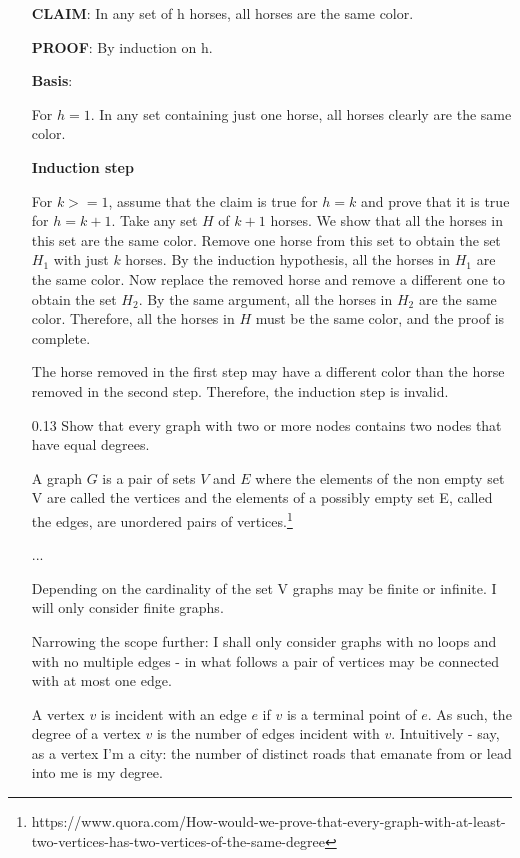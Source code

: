 \begin{enumerate}
          \textbf{CLAIM}: In any set of h horses, all horses are the same color.

          \textbf{PROOF}: By induction on h.

          \textbf{Basis}:

          For $h = 1$. In any set containing just one horse, all horses clearly are the same color.

          \textbf{Induction step}

          For $k >= 1$, assume that the claim is true for $h = k$ and prove that it is true for $h = k+1$. Take any set $H$ of $k+1$ horses. We show that all the horses in this set are the same color. Remove one horse from this set to obtain the set $H_1$ with just $k$ horses. By the induction hypothesis, all the horses in $H_1$ are the same color. Now replace the removed horse and remove a different one to obtain the set $H_2$. By the same argument, all the horses in $H_2$ are the same color. Therefore, all the horses in $H$ must be the same color, and the proof is complete.

          The horse removed in the first step may have a different color than the horse removed in the second step. Therefore, the induction step is invalid.

    \item[0.13]
          Show that every graph with two or more nodes contains two nodes that have equal degrees.

          A graph $G$ is a pair of sets $V$ and $E$ where the elements of the non empty set V are called the vertices and the elements of a possibly empty set E, called the edges, are unordered pairs of vertices.\footnote{https://www.quora.com/How-would-we-prove-that-every-graph-with-at-least-two-vertices-has-two-vertices-of-the-same-degree}

          ...

          Depending on the cardinality of the set V graphs may be finite or infinite. I will only consider finite graphs.

          Narrowing the scope further: I shall only consider graphs with no loops and with no multiple edges - in what follows a pair of vertices may be connected with at most one edge.

          A vertex $v$ is incident with an edge $e$ if $v$ is a terminal point of $e$. As such, the degree of a vertex $v$ is the number of edges incident with $v$. Intuitively - say, as a vertex I’m a city: the number of distinct roads that emanate from or lead into me is my degree.


\end{enumerate}
